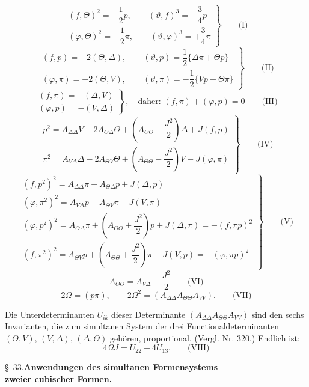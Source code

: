 \[
\left.\begin{array}{l}
(f,\Theta)^2=-\dfrac{1}{2}p,\qquad (\vartheta,f)^3=-\dfrac{3}{4}p\\[6pt]
(\varphi,\Theta)^2=-\dfrac{1}{2}\pi,\qquad (\vartheta,\varphi)^3=+\dfrac{3}{4}\pi
\end{array}\right\}\qquad\text{(I)}
\]
\[
\left.\begin{array}{l}
(f,p)=-2(\Theta,\Delta),\qquad (\vartheta,p)=\dfrac{1}{2}\{\Delta\pi+\Theta p\}\\[6pt]
(\varphi,\pi)=-2(\Theta,V),\qquad (\vartheta,\pi)=-\dfrac{1}{2}\{Vp+\Theta\pi\}
\end{array}\right\}\qquad\text{(II)}
\]
\[
\left.\begin{array}{l}
(f,\pi)=-(\Delta,V)\\
(\varphi,p)=-(V,\Delta)
\end{array}\right\},\quad\text{daher: }(f,\pi)+(\varphi,p)=0\qquad\text{(III)}
\]
\[
\left.\begin{array}{l}
p^2=A_{\Delta\Delta}V-2A_{\Theta\Delta}\Theta+\left(A_{\Theta\Theta}-\dfrac{J^2}{2}\right)\Delta+J(f,p)\\[6pt]
\pi^2=A_{V\Delta}\Delta-2A_{\Theta V}\Theta+\left(A_{\Theta\Theta}-\dfrac{J^2}{2}\right)V-J(\varphi,\pi)
\end{array}\right\}\qquad\text{(IV)}
\]
\[
\left.\begin{array}{l}
(f,p^2)^2=A_{\Delta\Delta}\pi+A_{\Theta\Delta}p+J(\Delta,p)\\
(\varphi,\pi^2)^2=A_{V\Delta}p+A_{\Theta V}\pi-J(V,\pi)\\
(\varphi,p^2)^2=A_{\Theta\Delta}\pi+\left(A_{\Theta\Theta}+\dfrac{J^2}{2}\right)p+J(\Delta,\pi)=-(f,\pi p)^2\\
(f,\pi^2)^2=A_{\Theta V}p+\left(A_{\Theta\Theta}+\dfrac{J^2}{2}\right)\pi-J(V,p)=-(\varphi,\pi p)^2
\end{array}\right\}\qquad\text{(V)}
\]
\[
A_{\Theta\Theta}=A_{V\Delta}-\dfrac{J^2}{2}\qquad\text{(VI)}
\]
\[
2\Omega=(p\pi),\qquad 2\Omega^2=(A_{\Delta\Delta}A_{\Theta\Theta}A_{VV}).\qquad\text{(VII)}
\]

Die Unterdeterminanten $U_{ik}$ dieser Determinante
$(A_{\Delta\Delta}A_{\Theta\Theta}A_{VV})$ sind den sechs Invarianten,
die zum simultanen System der drei Functionaldeterminanten $(\Theta,V)$,
$(V,\Delta)$, $(\Delta,\Theta)$ gehören, proportional. (Vergl. Nr. 320.)
Endlich ist:
\[
4\Omega J=U_{22}-4U_{13}.\qquad\text{(VIII)}
\]

\begin{center}
\S\ 33.\quad\textbf{Anwendungen des simultanen Formensystems\\
zweier cubischer Formen.}
\end{center}

